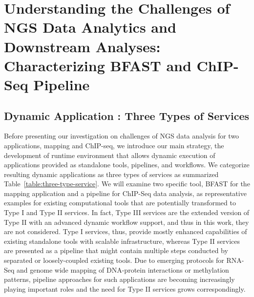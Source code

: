 \documentclass{cpeauth}
\begin{document}
\section{Understanding the Challenges of NGS Data Analytics and Downstream Analyses: Characterizing BFAST and ChIP-Seq Pipeline}

\subsection{Dynamic Application : Three Types of Services}

Before presenting our investigation on challenges of NGS data analysis for two applications, mapping and ChIP-seq, we introduce our main strategy, the development of runtime environment that allows dynamic execution of applications provided as standalone tools, pipelines, and workflows.   We categorize resulting dynamic applications as three types of services as summarized Table~\ref{table:three-type-service}. We will examine two specific tool, BFAST for the mapping application and a pipeline for ChIP-Seq data analysis, as representative examples for existing computational tools that are potentially transformed to Type I and Type II services.  In fact, Type III services are the extended version of Type II with an advanced dynamic workflow support, and thus in this work, they are not considered.  Type I services, thus, provide mostly enhanced capabilities of existing standalone tools with scalable infrastructure, whereas Type II services are presented as a pipeline that might contain multiple steps conducted by separated or loosely-coupled existing tools.  Due to emerging protocols for RNA-Seq and genome wide mapping of DNA-protein interactions or methylation patterns, pipeline approaches for such applications are becoming increasingly playing important roles and the need for Type II services grows correspondingly.    
\end{document}
